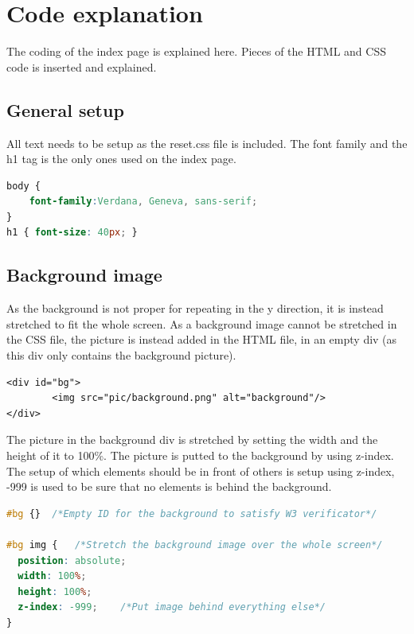 \section{Code explanation}
The coding of the index page is explained here. Pieces of the HTML and CSS code is inserted and explained.
\subsection{General setup}
All text needs to be setup as the reset.css file is included. The font family and the h1 tag is the only ones used on the index page. 
\begin{lstlisting}[language=CSS]
body {
	font-family:Verdana, Geneva, sans-serif;
}
h1 { font-size: 40px; }
\end{lstlisting}

\subsection{Background image}
As the background is not proper for repeating in the y direction, it is instead stretched to fit the whole screen. As a background image cannot be stretched in the CSS file, the picture is instead added in the HTML file, in an empty div (as this div only contains the background picture).
\begin{lstlisting}
<div id="bg">
		<img src="pic/background.png" alt="background"/>
</div>
\end{lstlisting}
The picture in the background div is stretched by setting the width and the height of it to 100\%. The picture is putted to the background by using z-index. The setup of which elements should be in front of others is setup using z-index, -999 is used to be sure that no elements is behind the background.
\begin{lstlisting}[language=CSS] 
#bg {}	/*Empty ID for the background to satisfy W3 verificator*/
		
#bg img {	/*Stretch the background image over the whole screen*/
  position: absolute;
  width: 100%;
  height: 100%;
  z-index: -999;	/*Put image behind everything else*/
}
\end{lstlisting}

